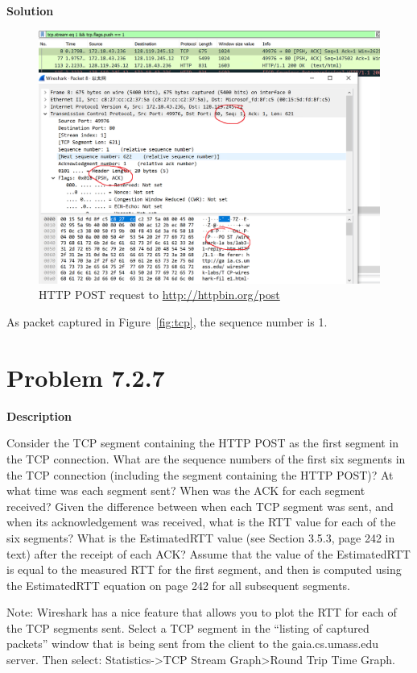 \documentclass[12pt,letterpaper]{ctexart}
\begin{document}
{\bf Solution}


\begin{figure}[H]
  \centering
  \includegraphics[width=\linewidth]{assets/post.png}
  \caption{HTTP POST request to \href{http://httpbin.org/post}{http://httpbin.org/post}}
  \label{fig:post}
\end{figure}

As packet captured in Figure~\ref{fig:tcp}, the sequence number is 1.

\section*{Problem 7.2.7}
{\bf Description}

Consider the TCP segment containing the HTTP POST as the first segment in the TCP connection.
What are the sequence numbers of the first six segments in the
TCP connection (including the segment containing the HTTP POST)?
At what time was each segment sent?  When was the ACK for each segment received?
Given the difference between when each TCP segment was sent, and when its acknowledgement was received, what is the RTT value for each of the six segments?
What is the EstimatedRTT value (see Section 3.5.3, page 242 in text) after the receipt of each ACK?
Assume that the value of the EstimatedRTT is equal to the measured RTT for the first segment, and then is computed using the EstimatedRTT equation on page 242 for all subsequent segments.

Note: Wireshark has a nice feature that allows you to plot the RTT for each of the TCP segments sent.  Select a TCP segment in the “listing of captured packets” window that is being sent from the client to the gaia.cs.umass.edu server.  Then select: Statistics->TCP Stream Graph>Round Trip Time Graph.
\end{document}
